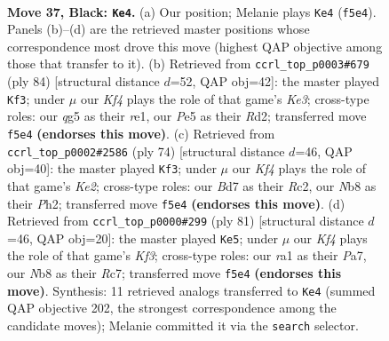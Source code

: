 \documentclass[11pt]{article}
\begin{document}
\clearpage

\begin{figure}[p]\centering
\begin{subfigure}{0.46\textwidth}\centering
\resizebox{\linewidth}{!}{%
\newchessgame
\chessboard[
  setfen={rn6/p2b1N2/2p5/P1PppkQ1/1P6/2P5/4K3/R7 b - - 1 37},
  showmover=false,
  pgfstyle=straightmove, color=movearrow, markmove={f5-e4}
]}
\caption{}
\end{subfigure}\hfill
\begin{subfigure}{0.46\textwidth}\centering
\resizebox{\linewidth}{!}{%
\newchessgame
\chessboard[
  setfen={8/5pk1/4n1p1/p2NP3/1p3P2/4K3/PP1R4/4r3 w - - 5 43},
  showmover=false,
  pgfstyle=straightmove, color=movearrow, markmove={e3-f3}
]}
\caption{}
\end{subfigure}
\\[4pt]
\begin{subfigure}{0.46\textwidth}\centering
\resizebox{\linewidth}{!}{%
\newchessgame
\chessboard[
  setfen={1r4k1/5p2/4p2p/p3P1p1/3B1n2/P7/1PR1K1PP/8 w - - 2 38},
  showmover=false,
  pgfstyle=straightmove, color=movearrow, markmove={e2-f3}
]}
\caption{}
\end{subfigure}\hfill
\begin{subfigure}{0.46\textwidth}\centering
\resizebox{\linewidth}{!}{%
\newchessgame
\chessboard[
  setfen={8/p1rn4/R4k1p/2p2ppP/2P5/PP3PN1/3K4/8 b - - 3 41},
  showmover=false,
  pgfstyle=straightmove, color=movearrow, markmove={f6-e5}
]}
\caption{}
\end{subfigure}
\caption{\textbf{Move 37, Black: \texttt{Ke4}.} (a) Our position; Melanie plays \texttt{Ke4} (\texttt{f5e4}). Panels (b)--(d) are the retrieved master positions whose correspondence most drove this move (highest QAP objective among those that transfer to it). (b) Retrieved from \texttt{ccrl\_top\_p0003\#679} (ply 84) [structural distance $d$=52, QAP obj=42]: the master played \texttt{Kf3}; under $\mu$ our \emph{Kf4} plays the role of that game's \emph{Ke3}; cross-type roles: our \emph{q}g5 as their \emph{r}e1, our \emph{P}e5 as their \emph{R}d2; transferred move \texttt{f5e4} \textbf{(endorses this move)}. (c) Retrieved from \texttt{ccrl\_top\_p0002\#2586} (ply 74) [structural distance $d$=46, QAP obj=40]: the master played \texttt{Kf3}; under $\mu$ our \emph{Kf4} plays the role of that game's \emph{Ke2}; cross-type roles: our \emph{B}d7 as their \emph{R}c2, our \emph{N}b8 as their \emph{P}h2; transferred move \texttt{f5e4} \textbf{(endorses this move)}. (d) Retrieved from \texttt{ccrl\_top\_p0000\#299} (ply 81) [structural distance $d$=46, QAP obj=20]: the master played \texttt{Ke5}; under $\mu$ our \emph{Kf4} plays the role of that game's \emph{Kf3}; cross-type roles: our \emph{r}a1 as their \emph{P}a7, our \emph{N}b8 as their \emph{R}c7; transferred move \texttt{f5e4} \textbf{(endorses this move)}. Synthesis: 11 retrieved analogs transferred to \texttt{Ke4} (summed QAP objective 202, the strongest correspondence among the candidate moves); Melanie committed it via the \texttt{search} selector.}
\label{fig:thought-m73}
\end{figure}
\end{document}
